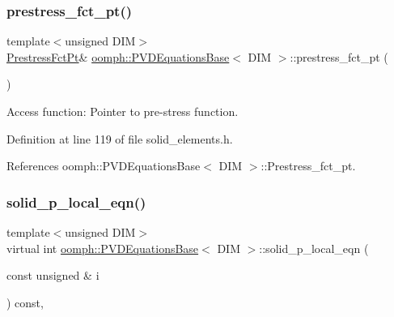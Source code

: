 \mbox{\label{classoomph_1_1PVDEquationsBase_a20ad29e9343f858dbf3440578c82711d}} 
\subsubsection{\texorpdfstring{prestress\+\_\+fct\+\_\+pt()}{prestress\_fct\_pt()}}
{\footnotesize\ttfamily template$<$unsigned D\+IM$>$ \\
\hyperlink{classoomph_1_1PVDEquationsBase_a457b9ffb2b62ecc0cf5fe61cf28e98e5}{Prestress\+Fct\+Pt}\& \hyperlink{classoomph_1_1PVDEquationsBase}{oomph\+::\+P\+V\+D\+Equations\+Base}$<$ D\+IM $>$\+::prestress\+\_\+fct\+\_\+pt (\begin{DoxyParamCaption}{ }\end{DoxyParamCaption})\hspace{0.3cm}{\ttfamily [inline]}}



Access function\+: Pointer to pre-\/stress function. 



Definition at line 119 of file solid\+\_\+elements.\+h.



References oomph\+::\+P\+V\+D\+Equations\+Base$<$ D\+I\+M $>$\+::\+Prestress\+\_\+fct\+\_\+pt.

\mbox{\label{classoomph_1_1PVDEquationsBase_a30d30a7dd711c84a175bf820ea56e3ef}} 
\subsubsection{\texorpdfstring{solid\+\_\+p\+\_\+local\+\_\+eqn()}{solid\_p\_local\_eqn()}}
{\footnotesize\ttfamily template$<$unsigned D\+IM$>$ \\
virtual int \hyperlink{classoomph_1_1PVDEquationsBase}{oomph\+::\+P\+V\+D\+Equations\+Base}$<$ D\+IM $>$\+::solid\+\_\+p\+\_\+local\+\_\+eqn (\begin{DoxyParamCaption}\item[{const unsigned \&}]{i }\end{DoxyParamCaption}) const\hspace{0.3cm}{\ttfamily [inline]}, {\ttfamily [virtual]}}



